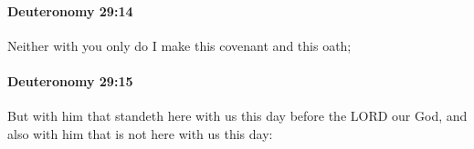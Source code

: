 		\paragraph{Deuteronomy 29:14} %
			\label{DEUTERONOMY-29-14}

			Neither with you only do I make this covenant and this oath;


		\paragraph{Deuteronomy 29:15} %
			\label{DEUTERONOMY-29-15}

			But with him that standeth here with us this day before the LORD our God, and also with him that is not here with us this day:


